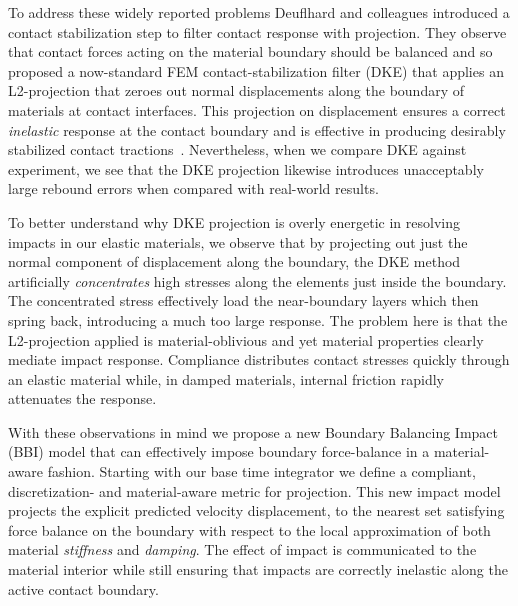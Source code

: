 To address these widely reported problems Deuflhard and colleagues \cite{Deuflhard:2008fu} introduced a contact stabilization step to filter contact response with projection. They observe that contact forces acting on the material boundary should be balanced and so proposed a now-standard FEM contact-stabilization filter (DKE) that applies an L2-projection that zeroes out normal displacements along the boundary of materials at contact interfaces.
This projection on displacement ensures a correct \emph{inelastic} response at the contact boundary and is effective in producing desirably stabilized contact tractions~\cite{Deuflhard:2008fu,Krause:2012im}. 
Nevertheless, when we compare DKE against experiment, we see that the DKE projection likewise introduces unacceptably large rebound errors when compared with real-world results.

To better understand why DKE projection is overly energetic in resolving impacts in our elastic materials, we observe that by projecting out just the normal component of displacement along the boundary,
the DKE method artificially \emph{concentrates} high stresses along the elements just inside the boundary. The concentrated stress effectively load the near-boundary layers which then spring back, introducing a much too large response.
The problem here is that the L2-projection applied is material-oblivious and yet material properties clearly mediate impact response. Compliance distributes contact stresses quickly through an elastic material while, in damped materials, internal friction rapidly attenuates the response. 

With these observations in mind we propose a new Boundary Balancing Impact (BBI) model that can effectively impose boundary force-balance in a material-aware fashion. Starting with our base time integrator we define a compliant, discretization- and material-aware metric for projection. 
This new impact model projects the explicit predicted velocity displacement, to the nearest set satisfying force balance on the boundary with respect to the local approximation of both material \emph{stiffness} and \emph{damping}. The effect of impact is communicated to the material interior while still ensuring that impacts are correctly inelastic along the active contact boundary. 
